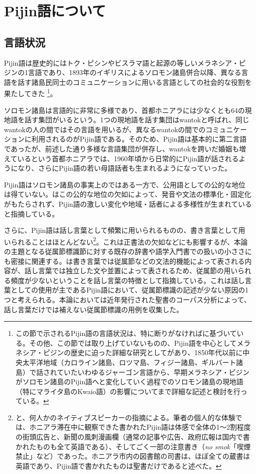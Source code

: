 \section{Pijin語について}
\subsection{言語状況}
Pijin語は歴史的にはトク・ピシンやビスラマ語と起源の等しいメラネシア・ピジンの1言語であり、1893年のイギリスによるソロモン諸島併合以降、異なる言語を話す諸島民同士のコミュニケーションに用いる言語としての社会的な役割を果たしてきた
\footnote{
この節で示されるPijin語の言語状況は、特に断りがなければ\cite{phonology}に基づいている。その他、この節では取り上げていないものの、Pijin語を中心としてメラネシア・ピジンの歴史に迫った詳細な研究として\cite{keesing}があり、1850年代以前に中央太平洋地域（カロライン諸島、ロツマ島、フィジー諸島、ギルバート諸島）で話されていたいわゆるジャーゴン言語から、早期メラネシア・ピジンがソロモン諸島のPijin語へと変化していく過程でのソロモン諸島の現地語（特にマライタ島のKwaio語）の影響についてまで詳細な記述と検討を行っている。}。

ソロモン諸島は言語的に非常に多様であり、首都ホニアラには少なくとも64の現地語を話す集団がいるという\citep{nativization}。1つの現地語を話す集団はwantokと呼ばれ、同じwantokの人の間ではその言語を用いるが、異なるwantokの間でのコミュニケーションに利用されるのがPijin語である。そのため、Pijin語は基本的に第二言語であったが、前述した通り多様な言語集団が併存し、wantokを跨いだ婚姻も増えているという首都ホニアラでは、1960年頃から日常的にPijin語が話されるようになり、さらにPijin語の若い母語話者も生まれるようになっていった。

Pijin語はソロモン諸島の事実上のではある一方で、公用語としての公的な地位は得ていない。\cite{phonology}はこの公的な地位の欠如によって、発音や文法の標準化・固定化がもたらされず、Pijin語の激しい変化や地域・話者による多様性が生まれていると指摘している。

さらに、Pijin語は話し言葉として頻繁に用いられるものの、書き言葉として用いられることはほとんどない\footnote{
\cite{phonology}と、何人かのネイティブスピーカーの指摘による。筆者の個人的な体験では、ホニアラ滞在中に観察できた書かれたPijin語は体感で全体の1～2割程度の街頭広告と、新聞の風刺漫画欄（通常の記事や広告、政府広報は国内で書かれたものも全て英語である）、そしてごく一部の注意書き（\textit{no smok}「喫煙禁止」など）であった。ホニアラ市内の図書館の司書は、ほぼ全ての蔵書は英語であり、Pijin語で書かれたものは聖書だけであると述べた。}。これは正書法の欠如などにも影響するが、本論の主題となる従属節標識節に対する既存の辞書や語学入門書での扱いの小ささにも密接に関連する。\cite{chafe}は書き言葉では従属節などの文法的機能によって表される内容が、話し言葉では独立した文や並置によって表されるため、従属節の用いられる頻度が少ないということを話し言葉の特徴として指摘している。これは話し言葉としての使用が主であるPijin語において、従属節標識の記述が少ない原因の1つと考えられる。本論においては近年発行された聖書のコーパス分析によって、話し言葉だけでは補えない従属節標識の用例を収集した。

